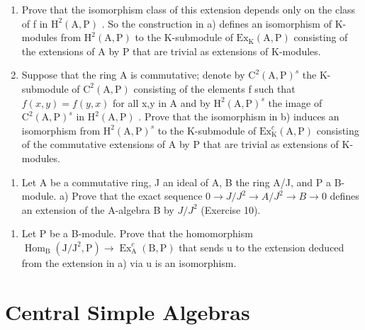 \begin{enumerate}
\def\labelenumi{\alph{enumi})}
\setcounter{enumi}{1}
\item
  Prove that the isomorphism class of this extension depends only on the class of f in \(\mathrm{H}^{2}(\mathrm{A},\mathrm{P})\) . So the construction in a) defines an isomorphism of K-modules from \(\mathrm{H}^{2}(\mathrm{A},\mathrm{P})\) to the K-submodule of \(\mathrm{Ex}_{\mathrm{K}}(\mathrm{A},\mathrm{P})\) consisting of the extensions of A by P that are trivial as extensions of K-modules.
\item
  Suppose that the ring A is commutative; denote by \(\mathrm{C}^{2}(\mathrm{A},\mathrm{P})^{s}\) the K-submodule of \(\mathrm{C}^{2}(\mathrm{A},\mathrm{P})\) consisting of the elements f such that \(f(x,y)=f(y,x)\) for all x,y in A and by \(\mathrm{H}^{2}(\mathrm{A},\mathrm{P})^{s}\) the image of \(\mathrm{C}^{2}(\mathrm{A},\mathrm{P})^{s}\) in \(\mathrm{H}^{2}(\mathrm{A},\mathrm{P})\) . Prove that the isomorphism in b) induces an isomorphism from \(\mathrm{H}^{2}(\mathrm{A},\mathrm{P})^{s}\) to the K-submodule of \(\mathrm{Ex}_{\mathrm{K}}^{c}(\mathrm{A},\mathrm{P})\) consisting of the commutative extensions of A by P that are trivial as extensions of K-modules.
\end{enumerate}

\begin{enumerate}
\def\labelenumi{\arabic{enumi})}
\setcounter{enumi}{11}
\tightlist
\item
  Let A be a commutative ring, J an ideal of A, B the ring A/J, and P a B-module. a) Prove that the exact sequence \(0 \rightarrow J/J^{2} \rightarrow A/J^{2} \rightarrow B \rightarrow 0\) defines an extension of the A-algebra B by \(J/J^{2}\) (Exercise 10).
\end{enumerate}

\begin{enumerate}
\def\labelenumi{\alph{enumi})}
\setcounter{enumi}{1}
\tightlist
\item
  Let P be a B-module. Prove that the homomorphism \(\operatorname{Hom}_{\mathrm{B}}(\mathrm{J}/\mathrm{J}^{2},\mathrm{P}) \to \operatorname{Ex}_{\mathrm{A}}^{c}(\mathrm{B},\mathrm{P})\) that sends u to the extension deduced from the extension in a) via u is an isomorphism.
\end{enumerate}

\section{Central Simple Algebras}


